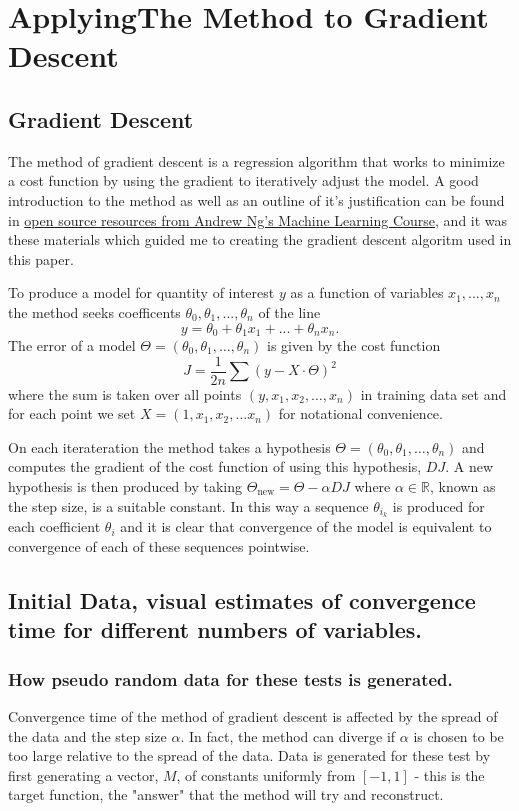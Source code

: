\documentclass[11pt]{article} %
\begin{document}
\section{ApplyingThe Method to Gradient Descent}

\subsection{Gradient Descent}
The method of gradient descent is a regression algorithm that works to minimize a cost function by using 
the gradient to iteratively adjust the model. A good introduction to the method as well as an outline of it's justification 
can be found in \href{http://openclassroom.stanford.edu/MainFolder/CoursePage.php?course=MachineLearning}{open source resources from Andrew Ng's Machine Learning Course}, 
and it was these materials which guided me to creating the gradient descent algoritm used in this paper. 

To produce a model for quantity of interest $y$  as a function of variables 
$x_{1}, ... , x_{n}$ the method seeks coefficents $\theta_{0}, \theta_{1}, ... , \theta_{n}$ of the line 
$$y = \theta_{0} + \theta_{1} x_{1} + ... + \theta_{n} x_{n}.$$  
The error of a model $\Theta = (\theta_{0}, \theta_{1}, \dots , \theta_{n})$ 
is given by the cost function 
$$J = \frac{1}{2n} \sum (y - X \cdot \Theta)^{2}$$ where the sum is taken over all points 
$(y, x_{1}, x_{2}, \dots , x_{n})$  in training data set and for each point we set $X = (1, x_{1}, x_{2}, ... x_{n})$
for notational convenience. 


On each iterateration the method takes a hypothesis $\Theta = (\theta_{0}, \theta_{1}, \dots , \theta_{n})$ 
and computes the gradient of the cost function of using this hypothesis, $DJ$.
A new hypothesis is then produced by taking $\Theta_{\mbox{new}} = \Theta - \alpha DJ$ where $\alpha \in \mathbb{R}$, known as
the step size, is a suitable constant. In this way a sequence $\theta_{i_{k}}$ is produced for each coefficient $\theta_{i}$ and it is clear that
convergence of the model is equivalent to convergence of each of these sequences pointwise. 




\subsection{Initial Data, visual estimates of convergence time for different numbers of variables.}
\subsubsection{How pseudo random data for these tests is generated.}
Convergence time of the method of gradient descent is affected by the spread of the data and the step size $\alpha$.  In fact, the method can diverge if 
$\alpha$ is chosen to be too large relative to the spread of the data. 
Data is generated for these test by first generating a vector, $M$, of constants uniformly from  $[-1,1]$ - this is the 
target function, the "answer" that the method will try and reconstruct.  
\end{document}
